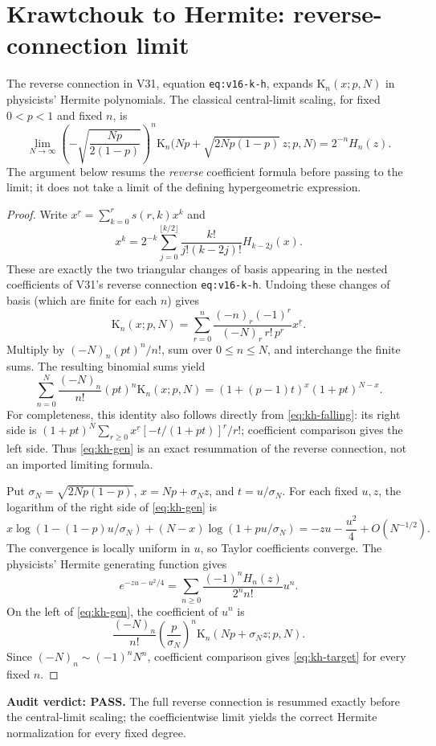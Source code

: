 \documentclass[11pt]{article}
\begin{document}
\section{Krawtchouk to Hermite: reverse-connection limit}
The reverse connection in V31, equation \texttt{eq:v16-k-h}, expands
$\mathrm K_n(x;p,N)$ in physicists' Hermite polynomials.  The
classical central-limit scaling, for fixed $0<p<1$ and fixed $n$, is
\begin{equation}\label{eq:kh-target}
\lim_{N\to\infty}
\left(-\sqrt{\frac{Np}{2(1-p)}}\right)^n
\mathrm K_n\bigl(Np+\sqrt{2Np(1-p)}\,z;p,N\bigr)
=2^{-n}H_n(z).
\end{equation}
The argument below resums the \emph{reverse} coefficient formula before
passing to the limit; it does not take a limit of the defining
hypergeometric expression.

\begin{proof}
Write $x^{\underline r}=\sum_{k=0}^r s(r,k)x^k$ and
\[
x^k=2^{-k}\sum_{j=0}^{\lfloor k/2\rfloor}
\frac{k!}{j!(k-2j)!}H_{k-2j}(x).
\]
These are exactly the two triangular changes of basis appearing in the
nested coefficients of V31's reverse connection \texttt{eq:v16-k-h}.
Undoing these changes of basis (which are finite for each $n$) gives
\begin{equation}\label{eq:kh-falling}
\mathrm K_n(x;p,N)=\sum_{r=0}^n
\frac{(-n)_r(-1)^r}{(-N)_r\,r!\,p^r}x^{\underline r}.
\end{equation}
Multiply by $(-N)_n(pt)^n/n!$, sum over $0\le n\le N$,
and interchange the finite sums. The resulting binomial sums yield
\begin{equation}\label{eq:kh-gen}
\sum_{n=0}^N\frac{(-N)_n}{n!}(pt)^n
\mathrm K_n(x;p,N)
=(1+(p-1)t)^x(1+pt)^{N-x}.
\end{equation}
For completeness, this identity also follows directly from
\eqref{eq:kh-falling}: its right side is
$(1+pt)^N\sum_{r\ge0}x^{\underline r}
[-t/(1+pt)]^r/r!$; coefficient comparison gives the left
side. Thus \eqref{eq:kh-gen} is an exact resummation of the reverse
connection, not an imported limiting formula.

Put $\sigma_N=\sqrt{2Np(1-p)}$,
$x=Np+\sigma_N z$, and $t=u/\sigma_N$.
For each fixed $u,z$, the logarithm of the right side of
\eqref{eq:kh-gen} is
\[
 x\log(1-(1-p)u/\sigma_N)
 +(N-x)\log(1+pu/\sigma_N)
=-zu-\frac{u^2}{4}+O(N^{-1/2}).
\]
The convergence is locally uniform in $u$, so Taylor coefficients
converge.  The physicists' Hermite generating function gives
\[
 e^{-zu-u^2/4}=\sum_{n\ge0}
\frac{(-1)^nH_n(z)}{2^n n!}u^n.
\]
On the left of \eqref{eq:kh-gen}, the coefficient of $u^n$ is
\[
\frac{(-N)_n}{n!}\left(\frac p{\sigma_N}\right)^n
\mathrm K_n(Np+\sigma_Nz;p,N).
\]
Since $(-N)_n\sim(-1)^nN^n$, coefficient comparison gives
\eqref{eq:kh-target} for every fixed $n$.
\end{proof}
\noindent\textbf{Audit verdict: PASS.} The full reverse connection is
resummed exactly before the central-limit scaling; the coefficientwise
limit yields the correct Hermite normalization for every fixed degree.
\end{document}
